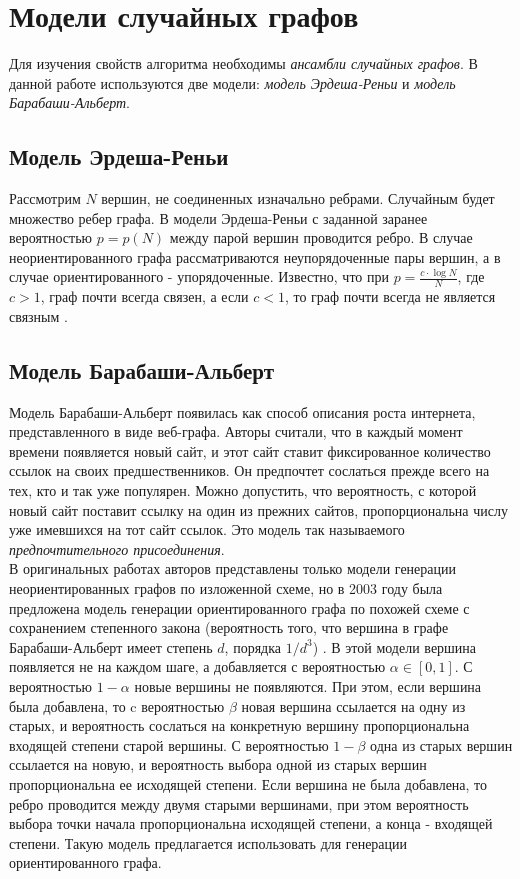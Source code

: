 \section{Модели случайных графов}
Для изучения свойств алгоритма необходимы \textit{ансамбли случайных графов}. В данной работе используются две модели: \textit{модель Эрдеша-Реньи} и \textit{модель Барабаши-Альберт}.

\subsection{Модель Эрдеша-Реньи}
Рассмотрим $N$ вершин, не соединенных изначально ребрами. Случайным будет множество ребер графа. В модели Эрдеша-Реньи с заданной заранее вероятностью $p=p(N)$ между парой вершин проводится ребро. В случае неориентированного графа рассматриваются неупорядоченные пары вершин, а в случае ориентированного - упорядоченные. Известно, что при $p=\frac{c\cdot \log N}{N}$, где $c>1$, граф почти всегда связен, а если $c<1$, то граф почти всегда не является связным \cite{randomgraphs}.

\subsection{Модель Барабаши-Альберт}
Модель Барабаши-Альберт появилась как способ описания роста интернета, представленного в виде веб-графа. Авторы считали, что в каждый момент времени появляется новый сайт, и этот сайт ставит фиксированное количество ссылок на своих предшественников. Он предпочтет сослаться прежде всего на тех, кто и так уже популярен. Можно допустить, что вероятность, с которой
новый сайт поставит ссылку на один из прежних сайтов, пропорциональна числу уже имевшихся на тот сайт ссылок. Это модель так называемого \textit{предпочтительного присоединения}.\\

В оригинальных работах авторов представлены только модели генерации неориентированных графов по изложенной схеме, но в 2003 году была предложена модель генерации ориентированного графа по похожей схеме с сохранением степенного закона (вероятность того, что вершина в графе Барабаши-Альберт имеет степень $d$, порядка $1/d^3$) \cite{barabashi2003}. В этой модели вершина появляется не на каждом шаге, а добавляется с вероятностью $\alpha\in [0,1]$. С вероятностью $1-\alpha$ новые вершины не появляются. При этом, если вершина была добавлена, то c вероятностью $\beta$ новая вершина ссылается на одну из старых, и вероятность сослаться на конкретную вершину пропорциональна входящей степени старой вершины. С вероятностью $1-\beta$ одна из старых вершин ссылается на новую, и вероятность выбора одной из старых вершин пропорциональна ее исходящей степени. Если вершина не была добавлена, то ребро проводится между двумя старыми вершинами, при этом вероятность выбора точки начала пропорциональна исходящей степени, а конца - входящей степени. Такую модель предлагается использовать для генерации ориентированного графа.

